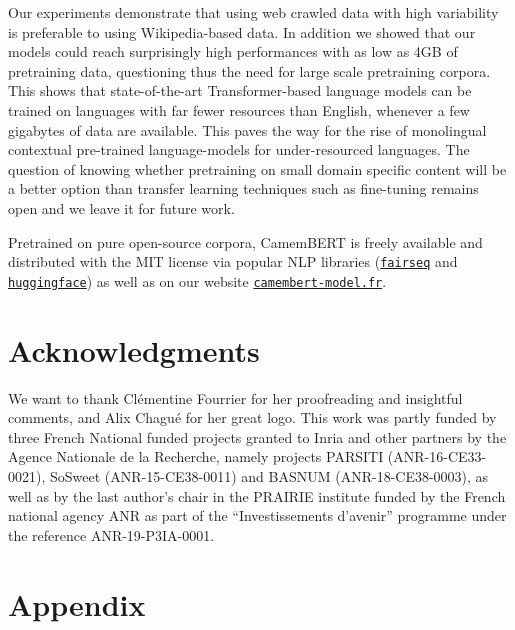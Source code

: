 \documentclass[11pt,a4paper]{article}
\newcommand{\camembert}{CamemBERT\xspace}
\begin{document}
Our experiments demonstrate that using web crawled
data with high variability is preferable to using Wikipedia-based data.  In addition we
showed that our models could reach surprisingly high performances with
as low as 4GB of pretraining data, questioning thus the need for large
scale pretraining corpora.  This shows that state-of-the-art
Transformer-based language models can be trained on languages with far
fewer resources than English, whenever a few gigabytes of data are
available. This paves the way for the rise of monolingual contextual
pre-trained language-models for under-resourced languages.  The
question of knowing whether pretraining on small domain specific
content will be a better option than transfer learning techniques such
as fine-tuning remains open and we leave it for future work.


Pretrained on pure open-source corpora, \camembert is freely
available and distributed with the MIT license via popular NLP
libraries (\href{https://github.com/pytorch/fairseq}{\tt fairseq} and \href{https://github.com/huggingface/transformers}{\tt huggingface}) as well as on our website
\href{https://camembert-model.fr}{\tt camembert-model.fr}.





\bigskip 

\section*{Acknowledgments}
We want to thank Clémentine Fourrier for her proofreading and insightful comments, and Alix Chagué for her great logo.
This work was partly funded by three French National funded projects granted to Inria and other partners by the Agence Nationale de la Recherche, namely projects PARSITI (ANR-16-CE33-0021), SoSweet (ANR-15-CE38-0011) and BASNUM (ANR-18-CE38-0003), as well as by the last author's chair in the PRAIRIE institute funded by the French national agency ANR as part of the ``Investissements d’avenir'' programme under the reference \mbox{ANR-19-P3IA-0001}.


\newpage 






\clearpage
\appendix


\section*{Appendix}
\end{document}

